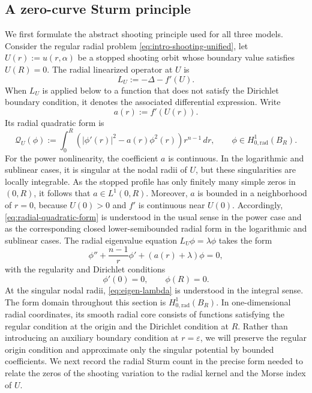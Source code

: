 \documentclass[11pt]{article}
\begin{document}
\subsection{A zero-curve Sturm principle}
We first formulate the abstract shooting principle used for all three
models. Consider the regular radial problem \eqref{eq:intro-shooting-unified},
let $U(r):=u(r,\alpha)$
be a stopped shooting orbit whose boundary value satisfies $U(R)=0$.
The radial linearized operator at $U$ is
\[
L_U:=-\Delta-f'(U).
\]
{When $L_U$ is applied below to a function that does not satisfy the
Dirichlet boundary condition, it denotes the associated differential expression.}
Write
\begin{equation*}
        a(r):=f'(U(r)).
\end{equation*}
Its radial quadratic form is
\begin{equation}
\label{eq:radial-quadratic-form}
\mathcal Q_U(\phi)
:=
\int_0^R
\left(
|\phi'(r)|^2-a(r)\phi^2(r)
\right)r^{n-1}\,dr,
\qquad
\phi\in H^1_{0,\mathrm{rad}}(B_R).
\end{equation}
For the power nonlinearity, the coefficient $a$ is continuous. In the
logarithmic and sublinear cases, it is singular at the nodal radii of
$U$, but these singularities are locally integrable. As the stopped profile has
only finitely many simple zeros in $(0,R)$, it follows that $a\in L^1(0,R)$.
{Moreover, $a$ is bounded in a neighborhood of $r=0$, because $U(0)>0$ and $f'$ is continuous near $U(0)$.}
Accordingly, \eqref{eq:radial-quadratic-form} is understood in the
usual sense in the power case and as the corresponding closed
lower-semibounded radial form in the logarithmic and sublinear cases.
The radial eigenvalue equation $L_U\phi=\lambda\phi$ takes the form
\begin{equation}\label{eq:eigen-lambda}
        \phi''+\frac{n-1}{r}\phi'+(a(r)+\lambda)\phi=0,
\end{equation}
with the regularity and Dirichlet conditions
\begin{equation*}
\phi'(0)=0,
\qquad
\phi(R)=0.
\end{equation*}
At the singular nodal radii, \eqref{eq:eigen-lambda} is understood in
the integral sense. The form domain throughout this section is
$H^1_{0,\mathrm{rad}}(B_R)$.
In one-dimensional radial coordinates, its smooth radial core consists of
functions satisfying the regular condition at the origin and the Dirichlet
condition at $R$.  {Rather than introducing an auxiliary boundary
condition at $r=\varepsilon$, we will preserve the regular origin condition
and approximate only the singular potential by bounded coefficients.}
We next record the radial Sturm count in the precise form needed to
relate the zeros of the shooting variation to the radial kernel and the Morse index of $U$.
\end{document}
